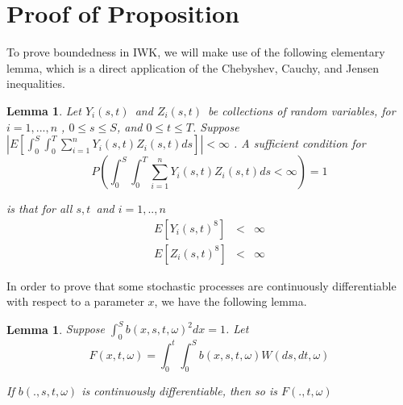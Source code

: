 \documentclass{article}
\newtheorem{lemma}[theorem]{Lemma}
\begin{document}
\appendix

\section{Proof of Proposition}

To prove boundedness in IWK, we will make use of the following elementary
lemma, which is a direct application of the Chebyshev, Cauchy, and Jensen
inequalities.


\begin{lemma}
\label{lemma::differentiable_F} \textit{Let }$Y_{i}(s,t)$\textit{\ and }$%
Z_{i}(s,t)$\textit{\ be collections of random variables, for }$i=1,...,n$%
\textit{, }$0\leq s\leq S$\textit{, and }$0\leq t\leq T$\textit{. Suppose }$%
|E[\int_{0}^{S}\int_{0}^{T}\sum_{i=1}^{n}Y_{i}(s,t)Z_{i}(s,t)ds]|<\infty $%
\textit{. A sufficient condition for }%
\begin{equation*}
P(\int_{0}^{S}\int_{0}^{T}\sum_{i=1}^{n}Y_{i}(s,t)Z_{i}(s,t)ds<\infty )=1
\end{equation*}

\textit{is that for all }$s,t$\textit{\ and }$i=1,..,n$%
\begin{eqnarray*}
E[Y_{i}(s,t)^{8}] &<&\infty \\
E[Z_{i}(s,t)^{8}] &<&\infty
\end{eqnarray*}
\end{lemma}

In order to prove that some stochastic processes are continuously
differentiable with respect to a parameter $x$, we have the following lemma.

\bigskip


\begin{lemma}
\label{lemma::differentiable_F} Suppose $\int_{0}^{S}b(x,s,t,\omega )^{2}dx=1
$. Let
\begin{equation*}
F(x,t,\omega )=\int_{0}^{t}\int_{0}^{S}b(x,s,t,\omega )W(ds,dt,\omega )
\end{equation*}

If $b(.,s,t,\omega )$ is continuously differentiable, then so is $%
F(.,t,\omega )$
\end{lemma}
\end{document}
